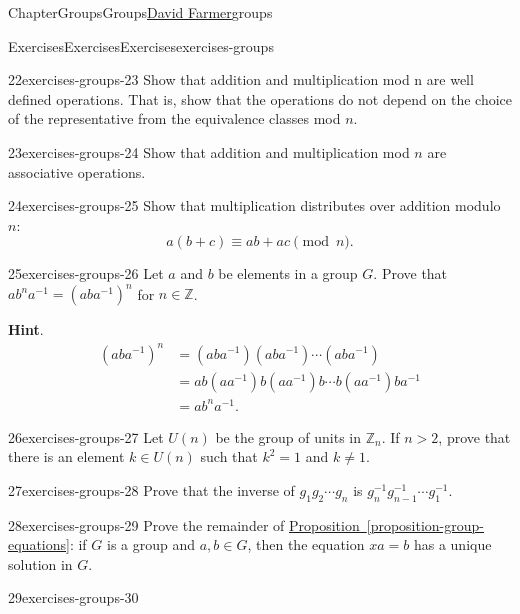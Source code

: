 \documentclass[oneside,10pt,]{book}
\newcommand{\blocktitlefont}{\relax}
\newcommand{\xreffont}{\relax}
\numberwithin{equation}{section}
\newcommand{\gt}{>}
\begin{document}
\begin{chapterptx}{Chapter}{Groups}{}{Groups}{\hyperlink{dfarmer}{David Farmer}}{}{groups}
\begin{exercises-section}{Exercises}{Exercises}{}{Exercises}{}{}{exercises-groups}
\begin{divisionexercise}{22}{}{}{exercises-groups-23}
Show that addition and multiplication mod \textdollar{}n\textdollar{} are well defined operations.  That is, show that the operations do not depend on the choice of the representative from the equivalence classes mod \(n\).%
\end{divisionexercise}%
\begin{divisionexercise}{23}{}{}{exercises-groups-24}%
Show that addition and multiplication mod \(n\) are associative operations.%
\end{divisionexercise}%
\begin{divisionexercise}{24}{}{}{exercises-groups-25}%
Show that multiplication distributes over addition modulo \(n\):%
\begin{equation*}
a(b  + c)  \equiv ab + ac  \pmod{n}.
\end{equation*}
%
\end{divisionexercise}%
\begin{divisionexercise}{25}{}{}{exercises-groups-26}%
Let \(a\) and \(b\) be elements in a group \(G\).  Prove that \(ab^na^{-1} = (aba^{-1})^n\) for \(n \in \mathbb Z\).%
\par\smallskip%
\noindent\textbf{\blocktitlefont Hint}.\hypertarget{exercises-groups-26-2}{}\quad{}%
\begin{align*}
(aba^{-1})^n & = (aba^{-1})(aba^{-1}) \cdots (aba^{-1})\\
& = ab(aa^{-1})b(aa^{-1})b \cdots b(aa^{-1})ba^{-1}\\
& = ab^na^{-1}.
\end{align*}
%
\end{divisionexercise}%
\begin{divisionexercise}{26}{}{}{exercises-groups-27}%
Let \(U(n)\) be the group of units in \({\mathbb Z}_n\). If \(n \gt 2\), prove that there is an element \(k \in U(n)\) such that \(k^2 = 1\) and \(k \neq 1\).%
\end{divisionexercise}%
\begin{divisionexercise}{27}{}{}{exercises-groups-28}%
Prove that the inverse of \(g _1 g_2 \cdots g_n\) is \(g_n^{-1} g_{n-1}^{-1} \cdots g_1^{-1}\).%
\end{divisionexercise}%
\begin{divisionexercise}{28}{}{}{exercises-groups-29}%
Prove the remainder of \hyperref[proposition-group-equations]{Proposition~{\xreffont\ref{proposition-group-equations}}}: if \(G\) is a group and \(a, b \in G\), then the equation \(xa = b\) has a unique solution in \(G\).%
\end{divisionexercise}%
\begin{divisionexercise}{29}{}{}{exercises-groups-30}%

\end{divisionexercise}
\end{exercises-section}
\end{chapterptx}
\end{document}
